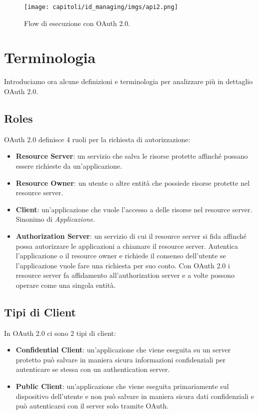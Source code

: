 \begin{figure}[H]
      \centering
      \texttt{[image: capitoli/id\_managing/imgs/api2.png]}
      \caption{Flow di esecuzione con OAuth 2.0.}
\end{figure}

\section{Terminologia}

Introduciamo ora alcune definizioni e terminologia per analizzare più in dettaglio
OAuth 2.0.

\subsection{Roles}

OAuth 2.0 definisce 4 ruoli per la richiesta di autorizzazione:

\begin{itemize}
      \item \textbf{Resource Server}: un servizio che salva le risorse protette affinché
            possano essere richieste da un'applicazione.
      \item \textbf{Resource Owner}: un utente o altre entità che possiede risorse protette
            nel resource server.
      \item \textbf{Client}: un'applicazione che vuole l'accesso a delle risorse nel
            resource server. Sinonimo di \textit{Applicazione}.
      \item \textbf{Authorization Server}: un servizio di cui il resource server si fida
            affinché possa autorizzare le applicazioni a chiamare il resource server.
            Autentica l'applicazione o il resource owner e richiede il consenso dell'utente
            se l'applicazione
            vuole fare una richiesta per suo conto. Con OAuth 2.0 i resource server fa
            affidamento all'authorization server e a volte possono operare come una
            singola entità.
\end{itemize}

\subsection{Tipi di Client}

In OAuth 2.0 ci sono 2 tipi di client:

\begin{itemize}
      \item \textbf{Confidential Client}: un'applicazione che viene eseguita su un server
            protetto può salvare in maniera sicura informazioni confidenziali per
            autenticare se stessa con un authentication server.
      \item \textbf{Public Client}: un'applicazione che viene eseguita primariamente sul
            dispositivo dell'utente e non può salvare in maniera sicura dati confidenziali
            e può autenticarsi con il server solo tramite OAuth.
\end{itemize}

